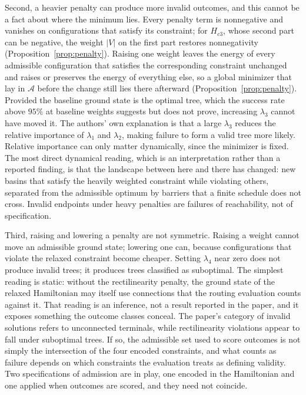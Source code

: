 \documentclass[11pt]{article}
\theoremstyle{definition}
\theoremstyle{remark}
\newcommand{\A}{\mathcal{A}}
\begin{document}
Second, a heavier penalty can produce more invalid outcomes, and this cannot be a fact about where the minimum lies. Every penalty term is nonnegative and vanishes on configurations that satisfy its constraint; for $H_{c3}$, whose second part can be negative, the weight $|V|$ on the first part restores nonnegativity (Proposition~\ref{prop:penalty}). Raising one weight leaves the energy of every admissible configuration that satisfies the corresponding constraint unchanged and raises or preserves the energy of everything else, so a global minimizer that lay in $\A$ before the change still lies there afterward (Proposition~\ref{prop:penalty}). Provided the baseline ground state is the optimal tree, which the success rate above $95\%$ at baseline weights suggests but does not prove, increasing $\lambda_3$ cannot have moved it. The authors' own explanation is that a large $\lambda_3$ reduces the relative importance of $\lambda_1$ and $\lambda_2$, making failure to form a valid tree more likely. Relative importance can only matter dynamically, since the minimizer is fixed. The most direct dynamical reading, which is an interpretation rather than a reported finding, is that the landscape between here and there has changed: new basins that satisfy the heavily weighted constraint while violating others, separated from the admissible optimum by barriers that a finite schedule does not cross. Invalid endpoints under heavy penalties are failures of reachability, not of specification.

Third, raising and lowering a penalty are not symmetric. Raising a weight cannot move an admissible ground state; lowering one can, because configurations that violate the relaxed constraint become cheaper. Setting $\lambda_4$ near zero does not produce invalid trees; it produces trees classified as suboptimal. The simplest reading is static: without the rectilinearity penalty, the ground state of the relaxed Hamiltonian may itself use connections that the routing evaluation counts against it. That reading is an inference, not a result reported in the paper, and it exposes something the outcome classes conceal. The paper's category of invalid solutions refers to unconnected terminals, while rectilinearity violations appear to fall under suboptimal trees. If so, the admissible set used to score outcomes is not simply the intersection of the four encoded constraints, and what counts as failure depends on which constraints the evaluation treats as defining validity. Two specifications of admission are in play, one encoded in the Hamiltonian and one applied when outcomes are scored, and they need not coincide.
\end{document}
